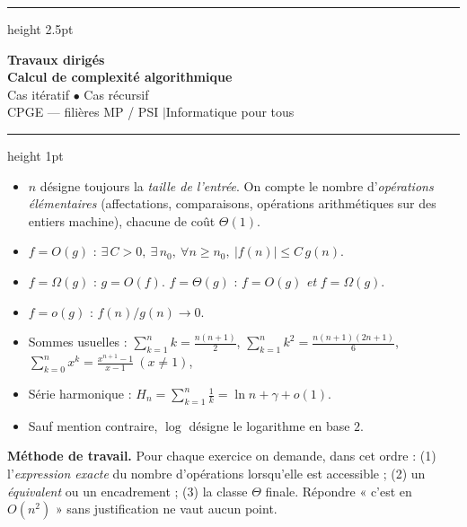 \documentclass[11pt,a4paper]{article}
\begin{document}
\begin{center}
  {\color{teal}\hrule height 2.5pt}
  \vspace{10pt}
  {\Huge\bfseries\color{teal} Travaux dirigés}\\[6pt]
  {\LARGE\bfseries Calcul de complexité algorithmique}\\[10pt]
  {\large Cas itératif \;$\bullet$\; Cas récursif}\\[8pt]
  {\normalsize CPGE --- filières MP / PSI \quad$|$\quad Informatique pour tous}\\[6pt]
  \vspace{6pt}
  {\color{teal}\hrule height 1pt}
\end{center}

\vspace{6pt}

\begin{rappel}
\begin{itemize}[leftmargin=*,itemsep=2pt]
  \item $n$ désigne toujours la \emph{taille de l'entrée}. On compte le nombre
        d'\emph{opérations élémentaires} (affectations, comparaisons, opérations
        arithmétiques sur des entiers machine), chacune de coût $\Theta(1)$.
  \item $f = O(g)$ : $\exists\, C>0,\ \exists\, n_0,\ \forall n\ge n_0,\ |f(n)|\le C\,g(n)$.
  \item $f = \Omega(g)$ : $g = O(f)$. \qquad $f = \Theta(g)$ : $f=O(g)$ \emph{et} $f=\Omega(g)$.
  \item $f = o(g)$ : $f(n)/g(n)\longrightarrow 0$.
  \item Sommes usuelles : $\displaystyle\sum_{k=1}^{n}k=\frac{n(n+1)}{2}$, \quad
        $\displaystyle\sum_{k=1}^{n}k^2=\frac{n(n+1)(2n+1)}{6}$, \quad
        $\displaystyle\sum_{k=0}^{n}x^k=\frac{x^{n+1}-1}{x-1}\ (x\ne1)$,
  \item Série harmonique : $\displaystyle H_n=\sum_{k=1}^{n}\frac1k=\ln n+\gamma+o(1)$.
  \item Sauf mention contraire, $\log$ désigne le logarithme en base $2$.
\end{itemize}
\end{rappel}

\begin{indication}
\textbf{Méthode de travail.} Pour chaque exercice on demande, dans cet ordre :
(1) l'\emph{expression exacte} du nombre d'opérations lorsqu'elle est accessible ;
(2) un \emph{équivalent} ou un encadrement ; (3) la classe $\Theta$ finale.
Répondre « c'est en $O(n^2)$ » sans justification ne vaut aucun point.
\end{indication}
\end{document}
